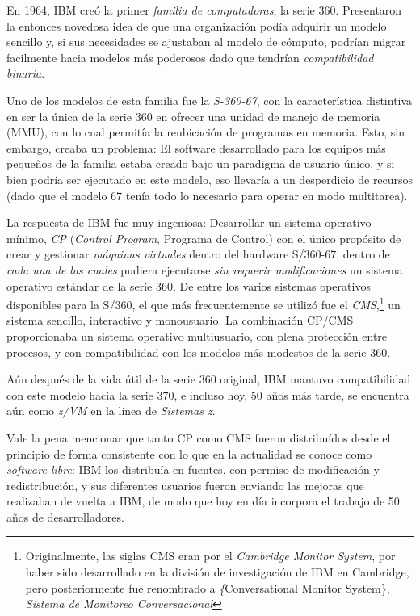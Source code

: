 \documentclass[11pt,fleqn]{book} %
\begin{document}
En 1964, IBM creó la primer \emph{familia de computadoras}, la
serie 360. Presentaron la entonces novedosa idea de que una
organización podía adquirir un modelo sencillo y, si sus necesidades
se ajustaban al modelo de cómputo, podrían migrar facilmente hacia
modelos más poderosos dado que tendrían \emph{compatibilidad binaria}.

Uno de los modelos de esta familia fue la \emph{S-360-67}, con la
característica distintiva en ser la única de la serie 360 en ofrecer
una unidad de manejo de memoria (MMU), con lo cual permitía la
reubicación de programas en memoria. Esto, sin embargo, creaba un
problema: El software desarrollado para los equipos más pequeños de la
familia estaba creado bajo un paradigma de usuario único, y si bien
podría ser ejecutado en este modelo, eso llevaría a un desperdicio de
recursos (dado que el modelo 67 tenía todo lo necesario para operar en
modo multitarea).

La respuesta de IBM fue muy ingeniosa: Desarrollar un sistema
operativo mínimo, \emph{CP} (\emph{Control Program}, Programa de Control) con el
único propósito de crear y gestionar \emph{máquinas virtuales} dentro del
hardware S/360-67, dentro de \emph{cada una de las cuales} pudiera
ejecutarse \emph{sin requerir modificaciones} un sistema operativo estándar
de la serie 360. De entre los varios sistemas operativos disponibles
para la S/360, el que más frecuentemente se utilizó fue el \emph{CMS},\footnote{Originalmente, las siglas CMS eran por el \emph{Cambridge Monitor System},
por haber sido desarrollado en la división de investigación de IBM en
Cambridge, pero posteriormente fue renombrado a \emph\{Conversational
Monitor System\}, \emph{Sistema de Monitoreo Conversacional} } un sistema
sencillo, interactivo y monousuario. La combinación CP/CMS
proporcionaba un sistema operativo multiusuario, con plena protección
entre procesos, y con compatibilidad con los modelos más modestos de
la serie 360.

Aún después de la vida útil de la serie 360 original, IBM mantuvo
compatibilidad con este modelo hacia la serie 370, e incluso hoy, 50
años más tarde, se encuentra aún como \emph{z/VM} en la línea de
\emph{Sistemas z}.

Vale la pena mencionar que tanto CP como CMS fueron distribuídos desde
el principio de forma consistente con lo que en la actualidad se conoce como
\emph{software libre}: IBM los distribuía en fuentes, con permiso de
modificación y redistribución, y sus diferentes usuarios fueron
enviando las mejoras que realizaban de vuelta a IBM, de modo que hoy
en día incorpora el trabajo de 50 años de desarrolladores.
\end{document}
